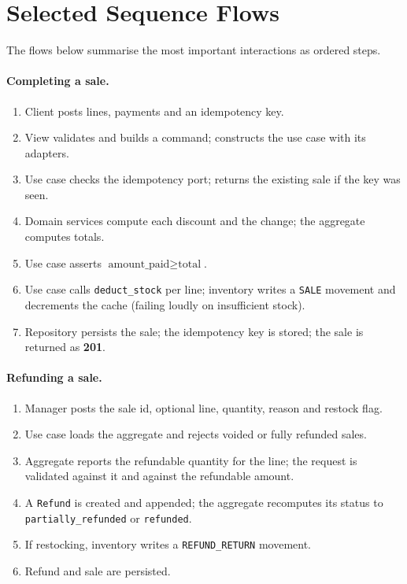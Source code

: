 \documentclass[11pt,a4paper]{article}
\begin{document}
\section{Selected Sequence Flows}
\label{app:sequences}

The flows below summarise the most important interactions as ordered steps.

\paragraph{Completing a sale.}
\begin{enumerate}[leftmargin=1.4em]
  \item Client posts lines, payments and an idempotency key.
  \item View validates and builds a command; constructs the use case with its adapters.
  \item Use case checks the idempotency port; returns the existing sale if the key was seen.
  \item Domain services compute each discount and the change; the aggregate computes totals.
  \item Use case asserts $\text{amount\_paid} \ge \text{total}$.
  \item Use case calls \texttt{deduct\_stock} per line; inventory writes a \texttt{SALE} movement and
  decrements the cache (failing loudly on insufficient stock).
  \item Repository persists the sale; the idempotency key is stored; the sale is returned as
  \textbf{201}.
\end{enumerate}

\paragraph{Refunding a sale.}
\begin{enumerate}[leftmargin=1.4em]
  \item Manager posts the sale id, optional line, quantity, reason and restock flag.
  \item Use case loads the aggregate and rejects voided or fully refunded sales.
  \item Aggregate reports the refundable quantity for the line; the request is validated against it
  and against the refundable amount.
  \item A \texttt{Refund} is created and appended; the aggregate recomputes its status to
  \texttt{partially\_refunded} or \texttt{refunded}.
  \item If restocking, inventory writes a \texttt{REFUND\_RETURN} movement.
  \item Refund and sale are persisted.
\end{enumerate}
\end{document}
